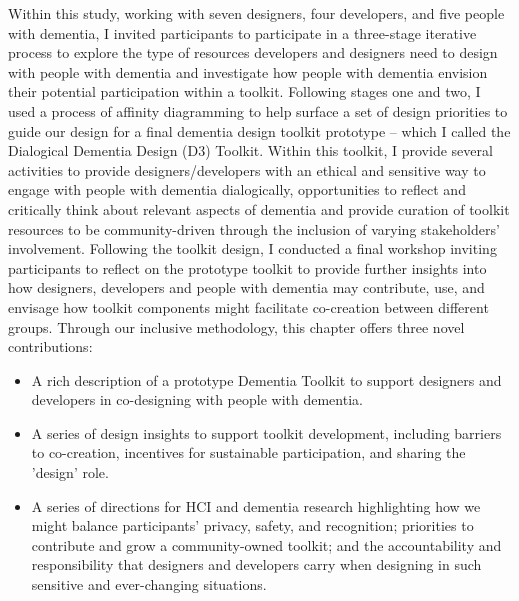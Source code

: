 Within this study, working with seven designers, four developers, and five people with dementia, I invited participants to participate in a three-stage iterative process to explore the type of resources developers and designers need to design with people with dementia and investigate how people with dementia envision their potential participation within a toolkit. Following stages one and two, I used a process of affinity diagramming to help surface a set of design priorities to guide our design for a final dementia design toolkit prototype – which I called the Dialogical Dementia Design (D3) Toolkit. Within this toolkit, I provide several activities to provide designers/developers with an ethical and sensitive way to engage with people with dementia dialogically, opportunities to reflect and critically think about relevant aspects of dementia and provide curation of toolkit resources to be community-driven through the inclusion of varying stakeholders' involvement. Following the toolkit design, I conducted a final workshop inviting participants to reflect on the prototype toolkit to provide further insights into how designers, developers and people with dementia may contribute, use, and envisage how toolkit components might facilitate co-creation between different groups. Through our inclusive methodology, this chapter offers three novel contributions:

\begin{itemize}
    \item  A rich description of a prototype Dementia Toolkit to support designers and developers in co-designing with people with dementia.
    \item  A series of design insights to support toolkit development, including barriers to co-creation, incentives for sustainable participation, and sharing the 'design' role.
    \item A series of directions for HCI and dementia research highlighting how we might balance participants' privacy, safety, and recognition; priorities to contribute and grow a community-owned toolkit; and the accountability and responsibility that designers and developers carry when designing in such sensitive and ever-changing situations.
\end{itemize}


